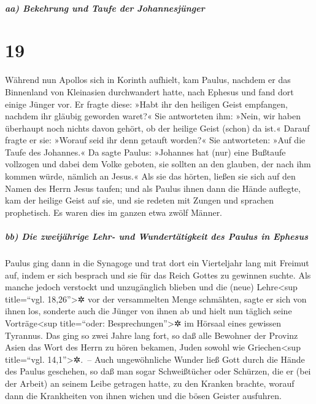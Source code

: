 \hypertarget{aa-bekehrung-und-taufe-der-johannesjuxfcnger}{%
\subparagraph{aa) Bekehrung und Taufe der
Johannesjünger}\label{aa-bekehrung-und-taufe-der-johannesjuxfcnger}}

\hypertarget{section-18}{%
\section{19}\label{section-18}}

 Während nun Apollos sich in Korinth aufhielt, kam Paulus,
nachdem er das Binnenland von Kleinasien durchwandert hatte, nach
Ephesus und fand dort einige Jünger vor.  Er fragte diese:
»Habt ihr den heiligen Geist empfangen, nachdem ihr gläubig geworden
waret?« Sie antworteten ihm: »Nein, wir haben überhaupt noch nichts
davon gehört, ob der heilige Geist (schon) da ist.« 
Darauf fragte er sie: »Worauf seid ihr denn getauft worden?« Sie
antworteten: »Auf die Taufe des Johannes.«  Da sagte
Paulus: »Johannes hat (nur) eine Bußtaufe vollzogen und dabei dem Volke
geboten, sie sollten an den glauben, der nach ihm kommen würde, nämlich
an Jesus.«  Als sie das hörten, ließen sie sich auf den
Namen des Herrn Jesus taufen;  und als Paulus ihnen dann
die Hände auflegte, kam der heilige Geist auf sie, und sie redeten mit
Zungen und sprachen prophetisch.  Es waren dies im ganzen
etwa zwölf Männer.

\hypertarget{bb-die-zweijuxe4hrige-lehr--und-wundertuxe4tigkeit-des-paulus-in-ephesus}{%
\subparagraph{bb) Die zweijährige Lehr- und Wundertätigkeit des Paulus
in
Ephesus}\label{bb-die-zweijuxe4hrige-lehr--und-wundertuxe4tigkeit-des-paulus-in-ephesus}}

 Paulus ging dann in die Synagoge und trat dort ein
Vierteljahr lang mit Freimut auf, indem er sich besprach und sie für das
Reich Gottes zu gewinnen suchte.  Als manche jedoch
verstockt und unzugänglich blieben und die (neue) Lehre\textless sup
title=``vgl. 18,26''\textgreater✲ vor der versammelten Menge schmähten,
sagte er sich von ihnen los, sonderte auch die Jünger von ihnen ab und
hielt nun täglich seine Vorträge\textless sup title=``oder:
Besprechungen''\textgreater✲ im Hörsaal eines gewissen Tyrannus.
 Das ging so zwei Jahre lang fort, so daß alle Bewohner
der Provinz Asien das Wort des Herrn zu hören bekamen, Juden sowohl wie
Griechen\textless sup title=``vgl. 14,1''\textgreater✲.~--
 Auch ungewöhnliche Wunder ließ Gott durch die Hände des
Paulus geschehen,  so daß man sogar Schweißtücher oder
Schürzen, die er (bei der Arbeit) an seinem Leibe getragen hatte, zu den
Kranken brachte, worauf dann die Krankheiten von ihnen wichen und die
bösen Geister ausfuhren.

